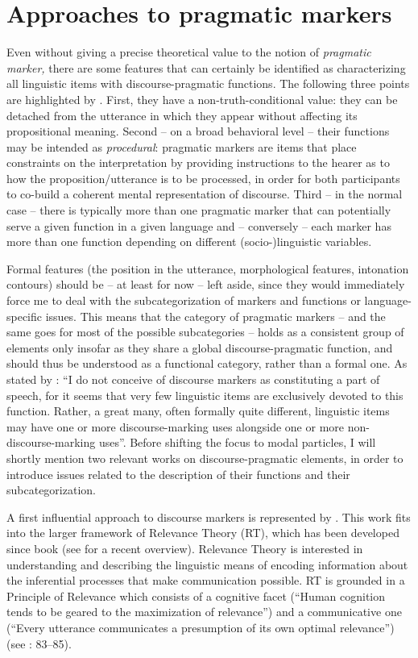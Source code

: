 \section{Approaches to pragmatic markers}
\hypertarget{Toc124860612}{}
Even without giving a precise theoretical value to the notion of \textit{pragmatic marker,} there are some features that can certainly be identified as characterizing all linguistic items with discourse-pragmatic functions. The following three points are highlighted by \citet[3--4]{FedrianiSansò2017}. First, they have a non-truth-conditional value: they can be detached from the utterance in which they appear without affecting its propositional meaning. Second – on a broad behavioral level – their functions may be intended as \textit{procedural}: pragmatic markers are items that place constraints on the interpretation by providing instructions to the hearer as to how the proposition/utterance is to be processed, in order for both participants to co-build a coherent mental representation of discourse. Third – in the normal case – there is typically more than one pragmatic marker that can potentially serve a given function in a given language and – conversely – each marker has more than one function depending on different (socio-)linguistic variables.

Formal features (the position in the utterance, morphological features, intonation contours) should be – at least for now – left aside, since they would immediately force me to deal with the subcategorization of markers and functions or language-specific issues. This means that the category of pragmatic markers – and the same goes for most of the possible subcategories – holds as a consistent group of elements only insofar as they share a global discourse-pragmatic function, and should thus be understood as a functional category, rather than a formal one. As stated by \citet[27]{Hansen2006}: “I do not conceive of discourse markers as constituting a part of speech, for it seems that very few linguistic items are exclusively devoted to this function. Rather, a great many, often formally quite different, linguistic items may have one or more discourse-marking uses alongside one or more non-discourse-marking uses”. Before shifting the focus to modal particles, I will shortly mention two relevant works on discourse-pragmatic elements, in order to introduce issues related to the description of their functions and their subcategorization.

A first influential approach to discourse markers is represented by \citet{Blakemore1987}. This work fits into the larger framework of Relevance Theory (RT), which has been developed since  book (see \citealt{Wilson2017} for a recent overview). Relevance Theory is interested in understanding and describing the linguistic means of encoding information about the inferential processes that make communication possible. RT is grounded in a Principle of Relevance which consists of a cognitive facet (“Human cognition tends to be geared to the maximization of relevance”) and a communicative one (“Every utterance communicates a presumption of its own optimal relevance”) (see \citealt{Wilson2017}: 83--85).

